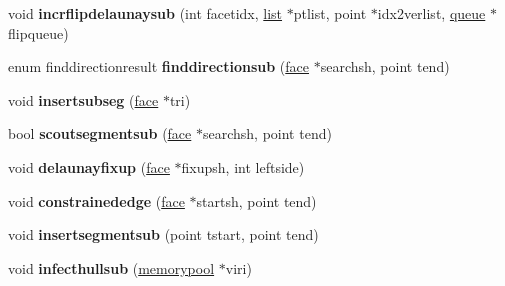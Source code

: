 \begin{DoxyCompactItemize}
\item 
\mbox{\label{classStemMesh3D_1_1tetgenmesh_aa5e636661f25ac9409df6c7bea77d746}} 
void {\bfseries incrflipdelaunaysub} (int facetidx, \hyperlink{classStemMesh3D_1_1tetgenmesh_1_1list}{list} $\ast$ptlist, point $\ast$idx2verlist, \hyperlink{classStemMesh3D_1_1tetgenmesh_1_1queue}{queue} $\ast$flipqueue)
\item 
\mbox{\label{classStemMesh3D_1_1tetgenmesh_afb13de4cecee7731bec48bdbe395f0e4}} 
enum finddirectionresult {\bfseries finddirectionsub} (\hyperlink{classStemMesh3D_1_1tetgenmesh_1_1face}{face} $\ast$searchsh, point tend)
\item 
\mbox{\label{classStemMesh3D_1_1tetgenmesh_a5085235be032b6fc362b238b8a43e278}} 
void {\bfseries insertsubseg} (\hyperlink{classStemMesh3D_1_1tetgenmesh_1_1face}{face} $\ast$tri)
\item 
\mbox{\label{classStemMesh3D_1_1tetgenmesh_a790e5f078904865b147948285b03e8f6}} 
bool {\bfseries scoutsegmentsub} (\hyperlink{classStemMesh3D_1_1tetgenmesh_1_1face}{face} $\ast$searchsh, point tend)
\item 
\mbox{\label{classStemMesh3D_1_1tetgenmesh_a4f311f96cb28d6de37630d13168cdb93}} 
void {\bfseries delaunayfixup} (\hyperlink{classStemMesh3D_1_1tetgenmesh_1_1face}{face} $\ast$fixupsh, int leftside)
\item 
\mbox{\label{classStemMesh3D_1_1tetgenmesh_a06fa2cb367af5d038120f2abb2e5c320}} 
void {\bfseries constrainededge} (\hyperlink{classStemMesh3D_1_1tetgenmesh_1_1face}{face} $\ast$startsh, point tend)
\item 
\mbox{\label{classStemMesh3D_1_1tetgenmesh_a1aabb4f3a1159ab5b9fd1b605e25e8f3}} 
void {\bfseries insertsegmentsub} (point tstart, point tend)
\item 
\mbox{\label{classStemMesh3D_1_1tetgenmesh_abbb822e80e32e4f0e232702380dd0b67}} 
void {\bfseries infecthullsub} (\hyperlink{classStemMesh3D_1_1tetgenmesh_1_1memorypool}{memorypool} $\ast$viri)

\end{DoxyCompactItemize}
